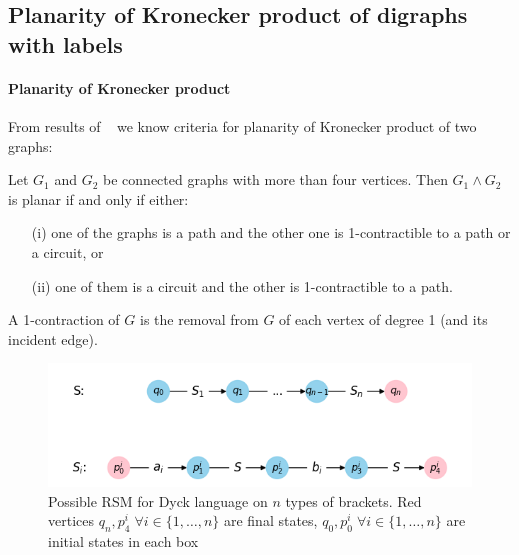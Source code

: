 

\subsection{Planarity of Kronecker product of digraphs with labels}

\paragraph{Planarity of Kronecker product}

From results of ~\cite{farzan1977kronecker} we know criteria for planarity of Kronecker product of two graphs:

\begin{theorem}
\label{theorem:farzan}
Let $G_1$ and $G_2$ be connected graphs with more than four vertices.
Then $G_1 \wedge G_2$ is planar if and only if either:
\begin{enumerate}
	\item[(i)] one of the graphs is a path and the other one is 1-contractible to a path or a circuit, or
	\item[(ii)] one of them is a circuit and the other is 1-contractible to a path.
\end{enumerate}
\end{theorem}

A 1-contraction of $G$ is the removal from $G$ of each vertex of
degree 1 (and its incident edge).


\begin{figure}[h]

  \begin{center}  
  \includegraphics[scale = 0.4]{dyck_n.png}
  \end{center}

  \caption{Possible RSM for Dyck language on $n$ types of brackets. Red vertices $q_n, p^i_4 \; \forall i \in \{1, \ldots, n\}$  are final states, $q_0, p^i_0 \; \forall i \in \{1, \ldots, n\}$ are initial states in each box}

  \label{fig:dyck_n}

\end{figure}


